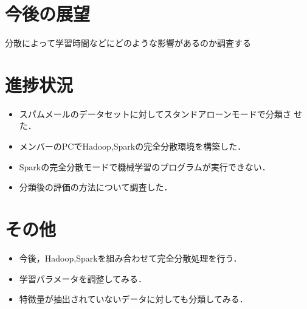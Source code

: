 \documentclass[a4paper,12pt]{jarticle}
\begin{document}
\section{今後の展望}
分散によって学習時間などにどのような影響があるのか調査する
\section{進捗状況}
\begin{itemize}
 \item スパムメールのデータセットに対してスタンドアローンモードで分類さ
	   せた．
 \item メンバーのPCでHadoop,Sparkの完全分散環境を構築した．
 \item Sparkの完全分散モードで機械学習のプログラムが実行できない．
 \item 分類後の評価の方法について調査した．
\end{itemize}

\section{その他}
\begin{itemize}
 \item 今後，Hadoop,Sparkを組み合わせて完全分散処理を行う．
 \item 学習パラメータを調整してみる．
 \item 特徴量が抽出されていないデータに対しても分類してみる．
\end{itemize}
\end{document}
